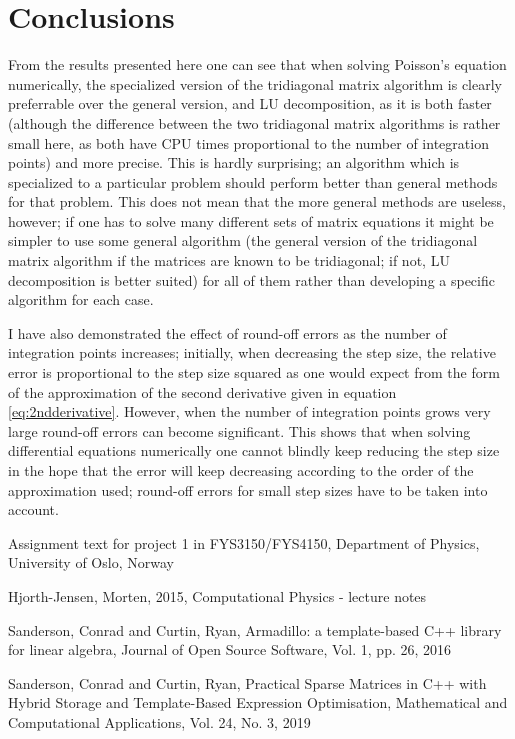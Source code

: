 \documentclass[a4paper,english]{article}
\begin{document}
\section{Conclusions}
From the results presented here one can see that when solving Poisson's equation numerically, the specialized version of the tridiagonal matrix algorithm is clearly preferrable over the general version, and LU decomposition, as it is both faster (although the difference between the two tridiagonal matrix algorithms is rather small here, as both have CPU times proportional to the number of integration points) and more precise. This is hardly surprising; an algorithm which is specialized to a particular problem should perform better than general methods for that problem. This does not mean that the more general methods are useless, however; if one has to solve many different sets of matrix equations it might be simpler to use some general algorithm (the general version of the tridiagonal matrix algorithm if the matrices are known to be tridiagonal; if not, LU decomposition is better suited) for all of them rather than developing a specific algorithm for each case. \par
I have also demonstrated the effect of round-off errors as the number of integration points increases; initially, when decreasing the step size, the relative error is proportional to the step size squared as one would expect from the form of the approximation of the second derivative given in equation \ref{eq:2ndderivative}. However, when the number of integration points grows very large round-off errors can become significant. This shows that when solving differential equations numerically one cannot blindly keep reducing the step size in the hope that the error will keep decreasing according to the order of the approximation used; round-off errors for small step sizes have to be taken into account.

\begin{thebibliography}{}
    Assignment text for project 1 in FYS3150/FYS4150,
    Department of Physics, University of Oslo, Norway

    Hjorth-Jensen, Morten,
    2015,
    Computational Physics - lecture notes

    Sanderson, Conrad and Curtin, Ryan,
    Armadillo: a template-based C++ library for linear algebra,
    Journal of Open Source Software, Vol. 1, pp. 26, 2016

    Sanderson, Conrad and Curtin, Ryan,
    Practical Sparse Matrices in C++ with Hybrid Storage and Template-Based Expression Optimisation,
    Mathematical and Computational Applications, Vol. 24, No. 3, 2019
\end{thebibliography}
\end{document}
